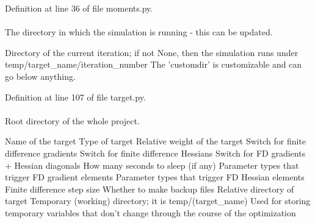 \-Definition at line 36 of file moments.\-py.

\hypertarget{classforcebalance_1_1target_1_1Target_a1da470037ef61c22dc44beb85cfa01a9}{
\paragraph[{rundir}]{}}\label{classforcebalance_1_1target_1_1Target_a1da470037ef61c22dc44beb85cfa01a9}


\-The directory in which the simulation is running -\/ this can be updated. 

\-Directory of the current iteration; if not \-None, then the simulation runs under temp/target\-\_\-name/iteration\-\_\-number \-The 'customdir' is customizable and can go below anything.

\-Definition at line 107 of file target.\-py.

\hypertarget{classforcebalance_1_1target_1_1Target_aede2856573b890cd47054ad36937d6f6}{
\paragraph[{tempdir}]{}}\label{classforcebalance_1_1target_1_1Target_aede2856573b890cd47054ad36937d6f6}


\-Root directory of the whole project. 

\-Name of the target \-Type of target \-Relative weight of the target \-Switch for finite difference gradients \-Switch for finite difference \-Hessians \-Switch for \-F\-D gradients + \-Hessian diagonals \-How many seconds to sleep (if any) \-Parameter types that trigger \-F\-D gradient elements \-Parameter types that trigger \-F\-D \-Hessian elements \-Finite difference step size \-Whether to make backup files \-Relative directory of target \-Temporary (working) directory; it is temp/(target\-\_\-name) \-Used for storing temporary variables that don't change through the course of the optimization 


